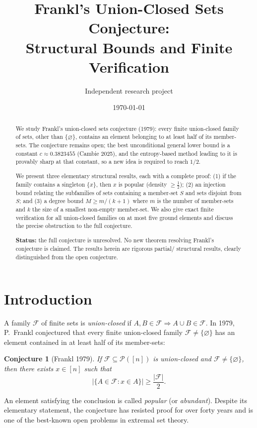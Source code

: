 \documentclass[11pt]{article}
\title{Frankl's Union-Closed Sets Conjecture:\\
Structural Bounds and Finite Verification}
\author{Independent research project}
\date{\today}
\newtheorem{conjecture}[theorem]{Conjecture}
\theoremstyle{definition}
\theoremstyle{remark}
\newcommand{\cF}{\mathcal{F}}
\newcommand{\cP}{\mathcal{P}}
\newcommand{\Nhalf}{\tfrac{1}{2}}
\begin{document}
\maketitle

\begin{abstract}
We study Frankl's union-closed sets conjecture (1979): every finite
union-closed family of sets, other than $\{\varnothing\}$, contains an element
belonging to at least half of its member-sets. The conjecture remains open;
the best unconditional general lower bound is a constant
$c\approx 0.3823455$ (Cambie 2025), and the entropy-based method leading to
it is provably sharp at that constant, so a new idea is required to reach
$1/2$.

We present three elementary structural results, each with a complete proof:
(1) if the family contains a singleton $\{x\}$, then $x$ is popular
(density $\ge \Nhalf$); (2) an injection bound relating the subfamilies of
sets containing a member-set $S$ and sets disjoint from $S$; and (3) a degree
bound $M\ge m/(k+1)$ where $m$ is the number of member-sets and $k$ the size
of a smallest non-empty member-set. We also give exact finite verification
for all union-closed families on at most five ground elements and discuss the
precise obstruction to the full conjecture.

\textbf{Status:} the full conjecture is unresolved. No new theorem resolving
Frankl's conjecture is claimed. The results herein are rigorous partial/
structural results, clearly distinguished from the open conjecture.
\end{abstract}

\section{Introduction}

A family $\cF$ of finite sets is \emph{union-closed} if
$A,B\in\cF\Rightarrow A\cup B\in\cF$. In 1979, P.~Frankl conjectured that
every finite union-closed family $\cF\neq\{\varnothing\}$ has an element
contained in at least half of its member-sets:

\begin{conjecture}[Frankl 1979]
\label{conj:frankl}
If $\cF\subseteq\cP([n])$ is union-closed and $\cF\neq\{\varnothing\}$, then
there exists $x\in[n]$ such that
$$\left|\{A\in\cF:x\in A\}\right|\ge \frac{|\cF|}{2}.$$
\end{conjecture}

An element satisfying the conclusion is called \emph{popular} (or
\emph{abundant}). Despite its elementary statement, the conjecture has
resisted proof for over forty years and is one of the best-known open problems
in extremal set theory.
\end{document}
